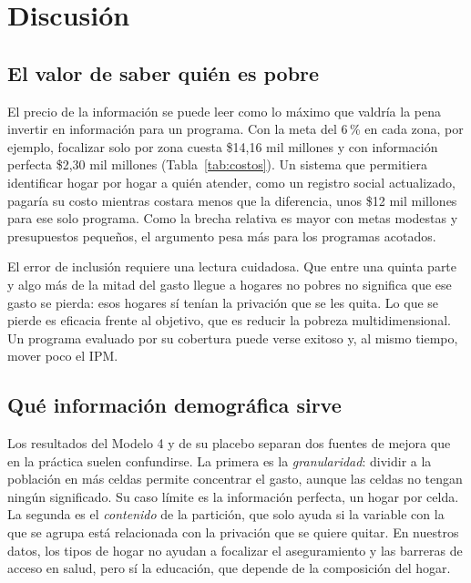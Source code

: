 \section{Discusión}\label{sec:discusion}

\subsection{El valor de saber quién es pobre}

El precio de la información se puede leer como lo máximo que valdría la pena
invertir en información para un programa. Con la meta del 6\,\% en cada zona,
por ejemplo, focalizar solo por zona cuesta \$14,16 mil millones y con
información perfecta \$2,30 mil millones (Tabla~\ref{tab:costos}). Un sistema que permitiera
identificar hogar por hogar a quién atender, como un registro social actualizado,
pagaría su costo mientras costara menos que la diferencia, unos \$12 mil millones
para ese solo programa. Como la brecha relativa es mayor con metas modestas y
presupuestos pequeños, el argumento pesa más para los programas acotados.

El error de inclusión requiere una lectura cuidadosa. Que entre una quinta parte
y algo más de la mitad del gasto llegue a hogares no pobres no significa que ese
gasto se pierda: esos hogares sí tenían la privación que se les quita. Lo que se
pierde es eficacia frente al objetivo, que es reducir la pobreza
multidimensional. Un programa evaluado por su cobertura puede verse exitoso y,
al mismo tiempo, mover poco el IPM.

\subsection{Qué información demográfica sirve}

Los resultados del Modelo 4 y de su placebo separan dos fuentes de mejora que en
la práctica suelen confundirse. La primera es la \emph{granularidad}: dividir a
la población en más celdas permite concentrar el gasto, aunque las celdas no
tengan ningún significado. Su caso límite es la información perfecta, un hogar
por celda. La segunda es el \emph{contenido} de la partición, que solo ayuda si
la variable con la que se agrupa está relacionada con la privación que se quiere
quitar. En nuestros datos, los tipos de hogar no ayudan a focalizar el
aseguramiento y las barreras de acceso en salud, pero sí la educación, que
depende de la composición del hogar.

